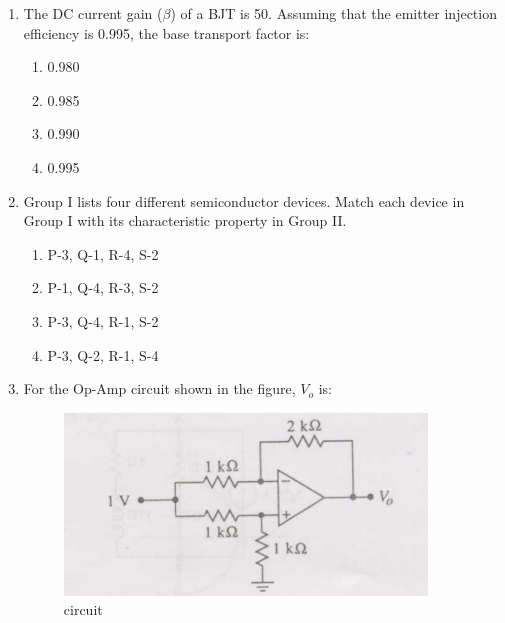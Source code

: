 \documentclass[journal,12pt,onecolumn]{IEEEtran}
\theoremstyle{remark}
\begin{document}
\begin{enumerate}
\item The DC current gain ($\beta$) of a BJT is 50. Assuming that the emitter injection efficiency is 0.995, the base transport factor is:
\hfill{}

\begin{multicols}{4}
\begin{enumerate}
  \item 0.980
  \item 0.985
  \item 0.990
  \item 0.995
\end{enumerate}
\end{multicols}

\item Group I lists four different semiconductor devices. Match each device in Group I with its characteristic property in Group II. 

\hfill{}

\begin{enumerate}
    \item P-3, Q-1, R-4, S-2
    \item P-1, Q-4, R-3, S-2
    \item P-3, Q-4, R-1, S-2
    \item P-3, Q-2, R-1, S-4
\end{enumerate}

\item For the Op-Amp circuit shown in the figure, $V_o$ is: 

\begin{figure}[H]
    \centering
    \includegraphics[width=0.4\linewidth]{Q36.png}
    \caption{circuit}
    \label{fig:full_wave}
\end{figure}
\hfill{}


\end{enumerate}
\end{document}
